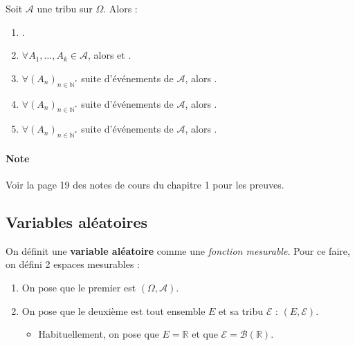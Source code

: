 \documentclass[10pt, french]{article}
\begin{document}
\begin{multicols*}{2}
\begin{definitionNOHFILLprop}
Soit $\mathcal{A}$ une tribu sur $\Omega$. Alors : 
\begin{enumerate}[label = \alph*)]
	\item	{}.
	\item	$\forall A_{1}, \dots, A_{k} \in \mathcal{A}$, alors  et .
	\item	$\forall (A_{n})_{n \in \mathbb{N}^{\ast}}$ suite d'événements de $\mathcal{A}$, alors .
	\item	$\forall (A_{n})_{n \in \mathbb{N}^{\ast}}$ suite d'événements de $\mathcal{A}$, alors .
	\item	$\forall (A_{n})_{n \in \mathbb{N}^{\ast}}$ suite d'événements de $\mathcal{A}$, alors .
\end{enumerate}

\paragraph{Note}	Voir la page 19 des notes de cours du chapitre 1 pour les preuves.
\end{definitionNOHFILLprop}



\columnbreak
\subsection{Variables aléatoires}

\begin{definitionNOHFILL}
On définit une \textbf{variable aléatoire} comme une \textit{fonction mesurable}. Pour ce faire, on défini 2 espaces mesurables : 
\begin{enumerate}
	\item	On pose que le premier est $(\Omega, \mathcal{A})$.
	\item	On pose que le deuxième est tout ensemble $E$ et sa tribu $\mathcal{E}$ : $(E, \mathcal{E})$.
		\begin{itemize}
		\item	Habituellement, on pose que $E = \mathbb{R}$ et que $\mathcal{E} = \mathcal{B}(\mathbb{R})$.
		\end{itemize}
\end{enumerate}


\end{definitionNOHFILL}
\end{multicols*}
\end{document}
